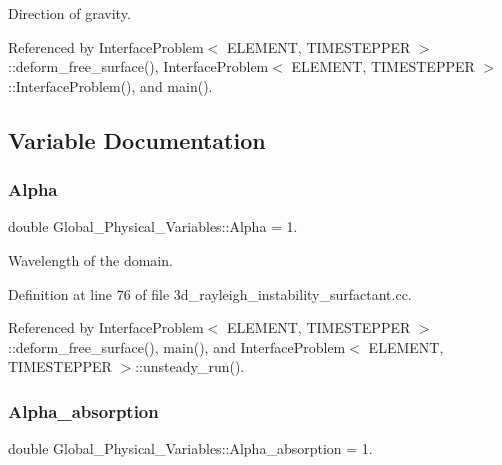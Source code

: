 Direction of gravity. 



Referenced by Interface\+Problem$<$ E\+L\+E\+M\+E\+N\+T, T\+I\+M\+E\+S\+T\+E\+P\+P\+E\+R $>$\+::deform\+\_\+free\+\_\+surface(), Interface\+Problem$<$ E\+L\+E\+M\+E\+N\+T, T\+I\+M\+E\+S\+T\+E\+P\+P\+E\+R $>$\+::\+Interface\+Problem(), and main().



\subsection{Variable Documentation}
\mbox{\label{namespaceGlobal__Physical__Variables_aa2e802ee7cc8e1ac900ba94c3ce86eb7}} 
\subsubsection{\texorpdfstring{Alpha}{Alpha}}
{\footnotesize\ttfamily double Global\+\_\+\+Physical\+\_\+\+Variables\+::\+Alpha = 1.}



Wavelength of the domain. 



Definition at line 76 of file 3d\+\_\+rayleigh\+\_\+instability\+\_\+surfactant.\+cc.



Referenced by Interface\+Problem$<$ E\+L\+E\+M\+E\+N\+T, T\+I\+M\+E\+S\+T\+E\+P\+P\+E\+R $>$\+::deform\+\_\+free\+\_\+surface(), main(), and Interface\+Problem$<$ E\+L\+E\+M\+E\+N\+T, T\+I\+M\+E\+S\+T\+E\+P\+P\+E\+R $>$\+::unsteady\+\_\+run().

\mbox{\label{namespaceGlobal__Physical__Variables_a012c14d34c5c0e65d114711c34a4361e}} 
\subsubsection{\texorpdfstring{Alpha\+\_\+absorption}{Alpha\_absorption}}
{\footnotesize\ttfamily double Global\+\_\+\+Physical\+\_\+\+Variables\+::\+Alpha\+\_\+absorption = 1.}



